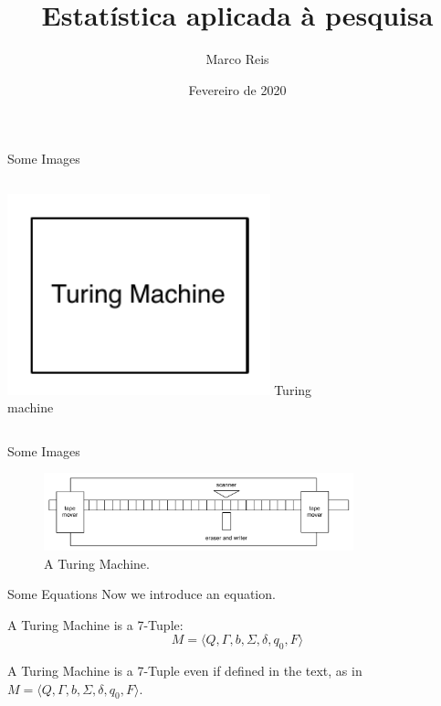 \documentclass[aspectratio=169]{beamer}
\title              {Estatística aplicada à pesquisa}
\author             {Marco Reis}
\institute          {Laboratório de Robótica e Sistemas Autônomos, Senai Cimatec}
\date               {Fevereiro de 2020}
\begin{document}
\begin{frame}[t,plain]
    \titlepage
\end{frame}
\begin{frame}[c]{Some Images}
    \begin{columns}[c]
            \includegraphics[width=0.8\textwidth]{block}
            Turing machine
    \end{columns}
\end{frame}
\begin{frame}[c]{Some Images}
    \begin{figure}
        \includegraphics[width=0.8\textwidth]{turingmachine}
        \caption{A Turing Machine.}
    \end{figure}
\end{frame}
\begin{frame}[c]{Some Equations}
Now we introduce an equation.
    \begin{theorem}
    A Turing Machine is a 7-Tuple:
        \begin{equation}
        \label{eq:turi}
            M = \langle Q, \Gamma, b, \Sigma, \delta, q_0, F \rangle
        \end{equation}
    \end{theorem}
A Turing Machine is a 7-Tuple even if defined in the text, as in $M = \langle Q, \Gamma, b, \Sigma, \delta, q_0, F \rangle$.
\end{frame}
\end{document}
